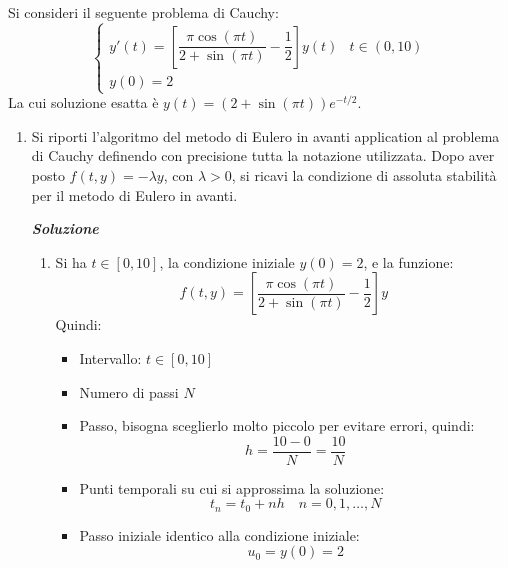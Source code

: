 Si consideri il seguente problema di Cauchy:
\begin{equation*}
    \begin{cases}
        y'(t) = \left[\dfrac{\pi \cos\left(\pi t\right)}{2 + \sin\left(\pi t\right)} - \dfrac{1}{2}\right] y(t) & t \in \left(0, 10\right) \\[1em]
        y(0) = 2
    \end{cases}
\end{equation*}
La cui soluzione esatta è $y(t) = \left(2 + \sin\left(\pi t\right)\right) e^{- t/2}$.
\begin{enumerate}
    \item Si riporti l'algoritmo del metodo di Eulero in avanti application al problema di Cauchy definendo con precisione tutta la notazione utilizzata. Dopo aver posto $f(t, y) = -\lambda y$, con $\lambda > 0$, si ricavi la condizione di assoluta stabilità per il metodo di Eulero in avanti.

    \textcolor{Green3}{\textbf{\emph{Soluzione}}}
    \begin{enumerate}
        \item Si ha $t \in \left[0, 10\right]$, la condizione iniziale $y(0) = 2$, e la funzione:
        \begin{equation*}
            f(t, y) = \left[\dfrac{\pi \cos\left(\pi t\right)}{2 + \sin\left(\pi t\right)} - \dfrac{1}{2}\right] y
        \end{equation*}
        Quindi:
        \begin{itemize}
            \item Intervallo: $t \in \left[0, 10\right]$
            \item Numero di passi $N$
            \item Passo, bisogna sceglierlo molto piccolo per evitare errori, quindi:
            \begin{equation*}
                h = \dfrac{10 - 0}{N} = \dfrac{10}{N}
            \end{equation*}
            \item Punti temporali su cui si approssima la soluzione:
            \begin{equation*}
                t_n = t_0 + n h \quad n = 0, 1, \dots, N
            \end{equation*}
            \item Passo iniziale identico alla condizione iniziale:
            \begin{equation*}
                u_0 = y(0) = 2
            \end{equation*}
        \end{itemize}


\end{enumerate}
\end{enumerate}

